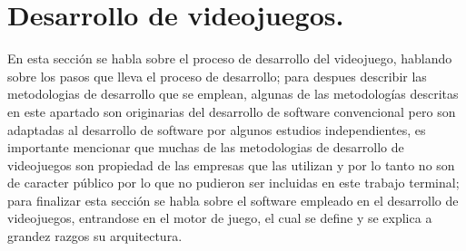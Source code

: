 \section{Desarrollo de videojuegos.}\label{DesVideojuego}
En esta sección se habla sobre el proceso de desarrollo del videojuego, hablando sobre los pasos que lleva el proceso de desarrollo; para despues describir las metodologias de desarrollo que se emplean, algunas de las metodologías descritas en este apartado son originarias del desarrollo de software convencional pero son adaptadas al desarrollo de software por algunos estudios independientes, es importante mencionar que muchas de las metodologias de desarrollo de videojuegos son propiedad de las empresas que las utilizan y por lo tanto no son de caracter público por lo que no pudieron ser incluidas en este trabajo terminal; para finalizar esta sección se habla sobre el software empleado en el desarrollo de videojuegos, entrandose en el motor de juego, el cual se define y se explica a grandez razgos su arquitectura.
